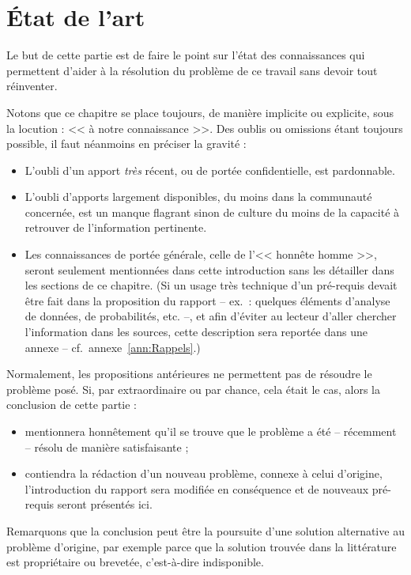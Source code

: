 \documentclass[11pt, french]{report-rd-info}
\begin{document}

\chapter{\'Etat de l'art}
\label{chap:EtatArt}

Le but de cette partie est de faire le point sur l'état des connaissances qui permettent d'aider à la résolution du problème de ce travail sans devoir tout réinventer.

Notons que ce chapitre se place toujours, de manière implicite ou explicite, sous la locution : << à notre connaissance >>. Des oublis ou omissions étant toujours possible, il faut néanmoins en préciser la gravité :
\begin{itemize}
    \item L'oubli d'un apport \emph{très} récent, ou de portée confidentielle, est pardonnable.
    \item L'oubli d'apports largement disponibles, du moins dans la communauté concernée, est un manque flagrant sinon de culture du moins de la capacité à retrouver de l'information pertinente.
    \item Les connaissances de portée générale, celle de l'<< honnête homme >>, seront seulement mentionnées dans cette introduction sans les détailler dans les sections de ce chapitre. (Si un usage très technique d'un pré-requis devait être fait dans la proposition du rapport -- ex.\ : quelques éléments d'analyse de données, de probabilités, etc. --, et afin d'éviter au lecteur d'aller chercher l'information dans les sources, cette description sera reportée dans une annexe -- cf.\ annexe~\ref{ann:Rappels}.)
\end{itemize}

Normalement, les propositions antérieures ne permettent pas de résoudre le problème posé. Si, par extraordinaire ou par chance, cela était le cas, alors la conclusion de cette partie :
\begin{itemize}
    \item mentionnera honnêtement qu'il se trouve que le problème a été -- récemment -- résolu de manière satisfaisante ;
    \item contiendra la rédaction d'un nouveau problème, connexe à celui d'origine, l'introduction du rapport sera modifiée en conséquence et de nouveaux pré-requis seront présentés ici.
\end{itemize}
Remarquons que la conclusion peut être la poursuite d'une solution alternative au problème d'origine, par exemple parce que la solution trouvée dans la littérature est propriétaire ou brevetée, c'est-à-dire indisponible.
\end{document}

